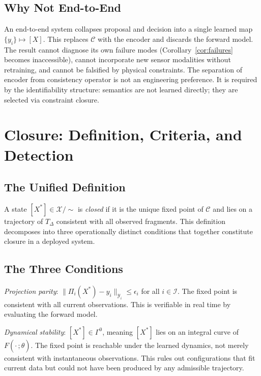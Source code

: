 \documentclass[12pt, oneside]{article}
\newcommand{\Xmod}{\mathcal{X}/{\sim}}
\begin{document}
\subsection{Why Not End-to-End}

An end-to-end system collapses proposal and decision into a single learned map
$\{y_i\} \mapsto [X]$. This replaces $\mathcal{C}$ with the encoder and discards the
forward model. The result cannot diagnose its own failure modes (Corollary~\ref{cor:failures}
becomes inaccessible), cannot incorporate new sensor modalities without retraining, and
cannot be falsified by physical constraints. The separation of encoder from consistency
operator is not an engineering preference. It is required by the identifiability
structure: semantics are not learned directly; they are selected via constraint closure.

\section{Closure: Definition, Criteria, and Detection}
\label{sec:closure}

\subsection{The Unified Definition}

A state $[X^*] \in \Xmod$ is \emph{closed} if it is the unique fixed point of
$\mathcal{C}$ and lies on a trajectory of $T_\Delta$ consistent with all observed
fragments. This definition decomposes into three operationally distinct conditions that
together constitute closure in a deployed system.

\subsection{The Three Conditions}

\emph{Projection parity}: $\|\Pi_i(X^*) - y_i\|_{\mathcal{Y}_i} \le \epsilon_i$ for
all $i \in \mathcal{I}$. The fixed point is consistent with all current observations.
This is verifiable in real time by evaluating the forward model.

\emph{Dynamical stability}: $[X^*] \in \Gamma^0$, meaning $[X^*]$ lies on an integral
curve of $F(\cdot\,;\hat{\theta})$. The fixed point is reachable under the learned
dynamics, not merely consistent with instantaneous observations. This rules out
configurations that fit current data but could not have been produced by any admissible
trajectory.
\end{document}
